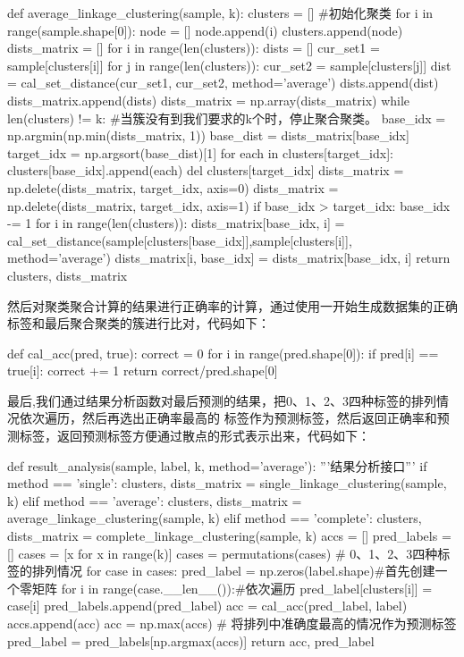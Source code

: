 \documentclass[UTF8,a4paper,10pt]{ctexart}
\begin{document}
\begin{python}
def average_linkage_clustering(sample, k):
    clusters = []   #初始化聚类
    for i in range(sample.shape[0]):
        node = []
        node.append(i)
        clusters.append(node)
    dists_matrix = []
    for i in range(len(clusters)):
        dists = []
        cur_set1 = sample[clusters[i]]
        for j in range(len(clusters)):
            cur_set2 = sample[clusters[j]]
            dist = cal_set_distance(cur_set1, cur_set2, method='average')
            dists.append(dist)
        dists_matrix.append(dists)
    dists_matrix = np.array(dists_matrix)
    while len(clusters) != k:  #当簇没有到我们要求的k个时，停止聚合聚类。
        base_idx = np.argmin(np.min(dists_matrix, 1))
        base_dist = dists_matrix[base_idx]
        target_idx = np.argsort(base_dist)[1]
        for each in clusters[target_idx]:
            clusters[base_idx].append(each)
        del clusters[target_idx]
        dists_matrix = np.delete(dists_matrix, target_idx, axis=0)
        dists_matrix = np.delete(dists_matrix, target_idx, axis=1)
        if base_idx > target_idx:
            base_idx -= 1
        for i in range(len(clusters)):
            dists_matrix[base_idx, i] = cal_set_distance(sample[clusters[base_idx]],sample[clusters[i]], method='average')
            dists_matrix[i, base_idx] = dists_matrix[base_idx, i]
    return clusters, dists_matrix
\end{python}

然后对聚类聚合计算的结果进行正确率的计算，通过使用一开始生成数据集的正确标签和最后聚合聚类的簇进行比对，代码如下：

\begin{python}
def cal_acc(pred, true):
    correct = 0
    for i in range(pred.shape[0]):
        if pred[i] == true[i]:
            correct += 1
    return correct/pred.shape[0]
\end{python}

最后,我们通过结果分析函数对最后预测的结果，把0、1、2、3四种标签的排列情况依次遍历，然后再选出正确率最高的
标签作为预测标签，然后返回正确率和预测标签，返回预测标签方便通过散点的形式表示出来，代码如下：

\begin{python}
def result_analysis(sample, label, k, method='average'):
    '''结果分析接口'''
    if method == 'single':
        clusters, dists_matrix = single_linkage_clustering(sample, k)
    elif method == 'average':
        clusters, dists_matrix = average_linkage_clustering(sample, k)
    elif method == 'complete':
        clusters, dists_matrix = complete_linkage_clustering(sample, k)
    accs = []
    pred_labels = []
    cases = [x for x in range(k)]
    cases = permutations(cases) # 0、1、2、3四种标签的排列情况
    for case in cases:
        pred_label = np.zeros(label.shape)#首先创建一个零矩阵
        for i in range(case.__len__()):#依次遍历
            pred_label[clusters[i]] = case[i]
        pred_labels.append(pred_label)
        acc = cal_acc(pred_label, label)
        accs.append(acc)
    acc = np.max(accs) # 将排列中准确度最高的情况作为预测标签
    pred_label = pred_labels[np.argmax(accs)]
    return acc, pred_label

\end{python}
\end{document}
